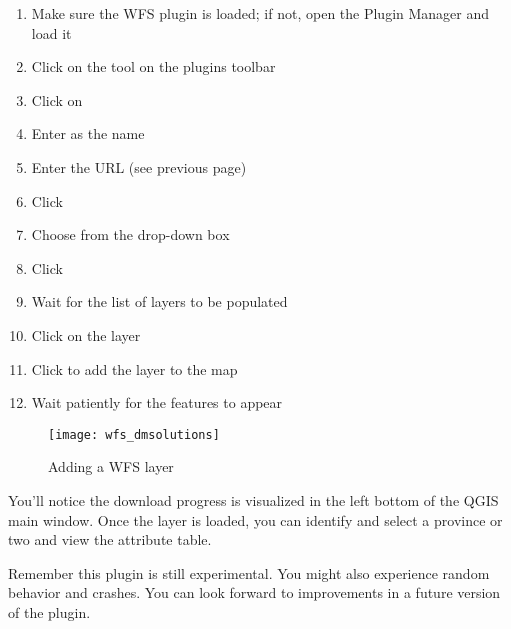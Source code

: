 \begin{enumerate}
  \item Make sure the WFS plugin is loaded; if not, open the Plugin Manager and load it
  \item Click on the  tool on the plugins toolbar
  \item Click on  
  \item Enter  as the name
  \item Enter the URL (see previous page)
  \item Click  
  \item Choose  from the drop-down box
  \item Click  
  \item Wait for the list of layers to be populated
  \item Click on the  layer
  \item Click  to add the layer to the map
  \item Wait patiently for the features to appear
\end{enumerate}

\begin{figure}[ht]
 \begin{center}
  \caption{Adding a WFS layer}\label{fig:wfs_dmsolutions}
  \texttt{[image: wfs\_dmsolutions]}
 \end{center}
\end{figure}

You'll notice the download progress is visualized in the left bottom of the QGIS main window. 
Once the layer is loaded, you can identify and select a province or two and view the 
attribute table.

Remember this plugin is still experimental. You might also experience random behavior 
and crashes. You can look forward to improvements in a future version of the plugin.

\begin{Tip}[h]\caption{\textsc{Finding WMS and WFS Servers}}
\end{Tip} 
